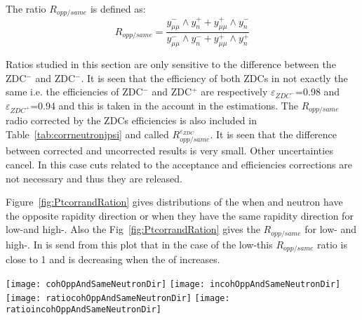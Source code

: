     The ratio $R_{opp/same}$ is defined as: 
    \begin{equation}
      R_{opp/same} = \frac{y^{-}_{\mu\mu} \wedge y_{n}^{+} + y^{+}_{\mu\mu} 
        \wedge y_{n}^{-}}{y^{-}_{\mu\mu} \wedge y_{n}^{-} + y^{+}_{\mu\mu} 
        \wedge y_{n}^{+}}
    \end{equation}
    
    Ratios studied in this section are only sensitive to the difference between
      the ZDC$^{-}$ and ZDC$^{-}$.
    It is seen that the efficiency of both ZDCs in not exactly the same i.e.
      the efficiencies of ZDC$^{-}$ and ZDC$^{+}$ are respectively 
      $\varepsilon_{ZDC^{-}}$=0.98 and  $\varepsilon_{ZDC^{+}}$=0.94 and this 
      is taken in the account in the estimations. 
    The $R_{opp/same}$ radio corrected by the ZDCs efficiencies is also 
      included in Table~\ref{tab:corrneutronjpsi} and called 
      $R_{opp/same}^{\varepsilon_{ZDC}}$. 
    It is seen that the difference between corrected and uncorrected results is
      very small. 
    Other uncertainties cancel. 
    In this case cuts related to the acceptance and efficiencies corrections 
      are not necessary and thus they are released.
    
    Figure~\ref{fig:PtcorrandRation} gives \pt distributions of the \JPsi 
      when \JPsi and neutron have the opposite rapidity direction or when they 
      have the same rapidity direction for low-\pt and high-\pt \JPsi. 
    Also the Fig~\ref{fig:PtcorrandRation} gives the $R_{opp/same}$ for low-\pt
      and high-\pt \JPsi. 
    In is send from this plot that in the case of the low-\pt \JPsi this 
      $R_{opp/same}$ ratio is close to 1 and is decreasing when the \pt of
      \JPsi increases.
  
    \begin{figure*}[!Hhtb]
      \begin{center}
        \texttt{[image: cohOppAndSameNeutronDir]}
        \texttt{[image: incohOppAndSameNeutronDir]} \\
        \texttt{[image: ratiocohOppAndSameNeutronDir]}
        \texttt{[image: ratioincohOppAndSameNeutronDir]}
      \caption{ \label{fig:PtcorrandRation}  
        Transverse momentum distribution of the $J/\psi$ when  $J/\psi$ and 
          neutron have the opposite rapidity direction and the transverse 
          momentum distribution of the $J/\psi$ when  $J/\psi$ and neutron
          have the same rapidity direction for low-\pt (top left) and 
          high-\pt (top right) \JPsi. Bottom: Ratios $R_{opp/same}$ for 
          low-\pt ( left) and high-\pt ( right) \JPsi.}
      \end{center}
    \end{figure*}
    
